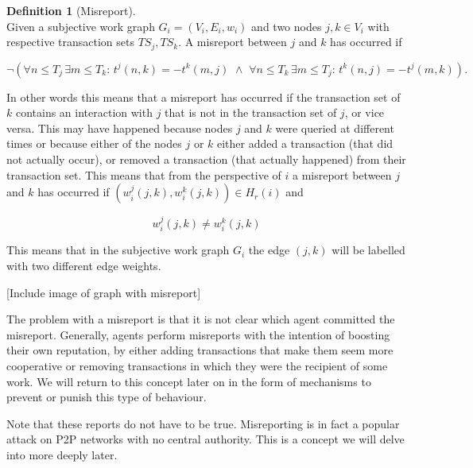 \documentclass[11pt,a4paper]{article}
\theoremstyle{definition}
\newtheorem{definition}{Definition}[section]
\theoremstyle{theorem}
\theoremstyle{proposition}
\theoremstyle{corollary}
\theoremstyle{lemma}
\theoremstyle{example}
\theoremstyle{remark}
\begin{document}
\begin{definition}[Misreport]\ \\
Given a subjective work graph $G_i=(V_i,E_i,w_i)$ and two nodes $j,k\in{}V_i$ with respective transaction sets $TS_j,TS_k$. A misreport between $j$ and $k$ has occurred if 

\[
\neg \left(\forall{} n\leq{}T_j\,\exists m\leq{}T_k:\,t^j(n,k)=-t^k(m,j)\,\,\wedge\,\,\forall{} n\leq{}T_k\,\exists m\leq{}T_j:\,t^k(n,j)=-t^j(m,k)\right).
\]

\noindent{}In other words this means that a misreport has occurred if the transaction set of $k$ contains an interaction with $j$ that is not in the transaction set of $j$, or vice versa. This may have happened because nodes $j$ and $k$ were queried at different times or because either of the nodes $j$ or $k$ either added a transaction (that did not actually occur), or removed a transaction (that actually happened) from their transaction set. This means that from the perspective of $i$ a misreport between $j$ and $k$ has occurred if $(w_i^j(j,k),w_i^k(j,k))\in{}H_r(i)$ and

\[
w_i^j(j,k)\neq{}w_i^k(j,k)
\] 

\noindent{}This means that in the subjective work graph $G_i$ the edge $(j,k)$ will be labelled with two different edge weights.
\begin{center}[Include image of graph with misreport] \vspace{1em}\\ \end{center}

\noindent{}The problem with a misreport is that it is not clear which agent committed the misreport. Generally, agents perform misreports with the intention of boosting their own reputation, by either adding transactions that make them seem more cooperative or removing transactions in which they were the recipient of some work. We will return to this concept later on in the form of mechanisms to prevent or punish this type of behaviour. \vspace{1em}\\
\end{definition}
\noindent{}Note that these reports do not have to be true. Misreporting is in fact a popular attack on P2P networks with no central authority. This is a concept we will delve into more deeply later. \vspace{1em}\\
\end{document}
